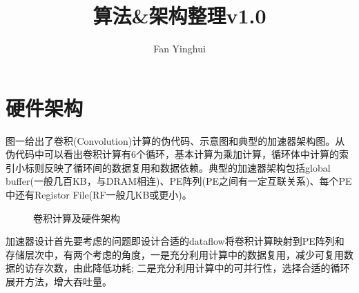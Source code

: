 \documentclass[UTF8]{scrartcl}
\title{算法\&架构整理v1.0}
\author{Fan Yinghui}
\begin{document}
\maketitle

\begin{abstract}

\end{abstract}

\section{硬件架构}

 图一给出了卷积(Convolution)计算的伪代码、示意图和典型的加速器架构图。从伪代码中可以看出卷积计算有6个循环，基本计算为乘加计算，循环体中计算的索引小标则反映了循环间的数据复用和数据依赖。典型的加速器架构包括global buffer(一般几百KB，与DRAM相连)、PE阵列(PE之间有一定互联关系)、每个PE中还有Registor File(RF一般几KB或更小)。

	\begin{figure}[h]
		\centering
		\caption{卷积计算及硬件架构}
		\label{fig1}
	\end{figure}
	

 加速器设计首先要考虑的问题即设计合适的dataflow将卷积计算映射到PE阵列和存储层次中，有两个考虑的角度，一是充分利用计算中的数据复用，减少可复用数据的访存次数，由此降低功耗; 二是充分利用计算中的可并行性，选择合适的循环展开方法，增大吞吐量。
\end{document}
